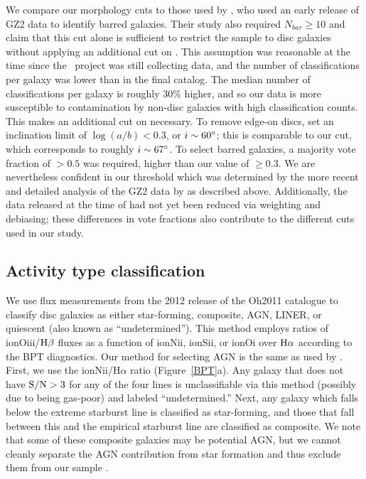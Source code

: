 We compare our morphology cuts to those used by \citet{Masters2011}, who used an early release of GZ2 data to identify barred galaxies. Their study also required $N_{bar}\ge10$ and claim that this cut alone is sufficient to restrict the sample to disc galaxies without applying an additional cut on \pfeatures. This assumption was reasonable at the time since the \gztwo~project was still collecting data, and the number of classifications per galaxy was lower than in the final catalog. The median number of classifications per galaxy is roughly 30\% higher, and so our data is more susceptible to contamination by non-disc galaxies with high classification counts. This makes an additional cut on \pfeatures necessary. To remove edge-on discs, \citet{Masters2011} set an inclination limit of $\log(a/b)<0.3$, or $i\sim60\mbox{$^\circ$}$; this is comparable to our \pnotedgeon cut, which corresponds to roughly $i\sim67\mbox{$^\circ$}$. To select barred galaxies, a majority vote fraction of \pbar$>0.5$ was required, higher than our value of \pbar$\ge0.3$. We are nevertheless confident in our threshold which was determined by the more recent and detailed analysis of the GZ2 data by \citet{Willett2013} as described above. Additionally, the data released at the time of \citet{Masters2011} had not yet been reduced via weighting and debiasing; these differences in vote fractions also contribute to the different cuts used in our study.
 
\subsection{Activity type classification}
\label{sec:Activity}
We use flux measurements from the 2012 release of the Oh2011 catalogue \citep{Oh2011} to classify disc galaxies as either star-forming, composite, AGN, LINER, or quiescent (also known as ``undetermined''). This method employs ratios of ion{O}{iii}/$\rm H\beta$ fluxes as a function of ion{N}{ii}, ion{S}{ii}, or ion{O}{i} over $\rm H\alpha$ according to the BPT diagnostics. Our method for selecting AGN is the same as used by \citet{Schawinski2007,Schawinski2010}. First, we use the ion{N}{ii}/H$\alpha$ ratio (Figure~\ref{BPT}a). Any galaxy that does not have $\rm S/N>3$ for any of the four lines is unclassifiable via this method (possibly due to being gas-poor) and labeled ``undetermined.'' Next, any galaxy which falls below the \citet{Kewley2001} extreme starburst line is classified as star-forming, and those that fall between this and the \citet{Kauffmann2003a} empirical starburst line are classified as composite. We note that some of these composite galaxies may be potential AGN, but we cannot cleanly separate the AGN contribution from star formation and thus exclude them from our sample \citep{Schawinski2010}. 

